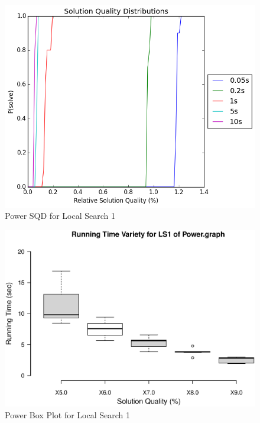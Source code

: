 \documentclass{sig-alternate-05-2015}
\begin{document}
\begin{figure}
\centering
\caption{Power SQD for Local Search 1}
\includegraphics[scale=0.4]{PowerLS1_sqd_graph.png}
\end{figure}

\begin{figure}
\centering
\caption{Power Box Plot for Local Search 1}
\includegraphics[scale=0.33]{PowerLS1_boxplot.eps}
\end{figure}
\end{document}
